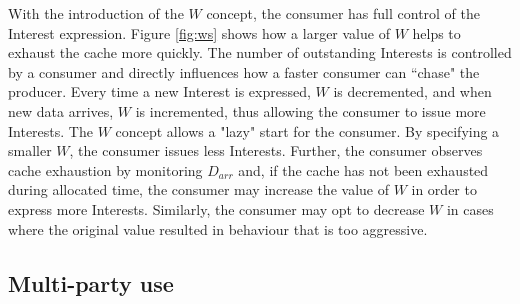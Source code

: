 \documentclass{icn/sig-alternate-2012} %
\begin{document}
With the introduction of the $W$ concept, the consumer has full control of the Interest expression. Figure \ref{fig:ws} shows how a larger value of $W$ helps to exhaust the cache more quickly. The number of outstanding Interests is controlled by a consumer and directly influences how a faster consumer can ``chase" the producer. Every time a new Interest is expressed, $W$ is decremented, and when new data arrives, $W$ is incremented, thus allowing the consumer to issue more Interests. The $W$ concept allows a "lazy" start for the consumer. By specifying a smaller $W$, the consumer issues less Interests. Further, the consumer observes cache exhaustion by monitoring $D_{arr}$ and, if the cache has not been exhausted during allocated time, the consumer may increase the value of $W$ in order to express more Interests. Similarly, the consumer may opt to decrease $W$ in cases where the original value resulted in behaviour that is too aggressive.






\subsection{Multi-party use}
\end{document}
